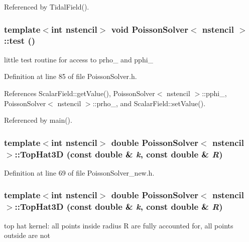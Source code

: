 Referenced by TidalField().

\subsubsection[{test}]{\setlength{\rightskip}{0pt plus 5cm}template$<$int nstencil$>$ void {\bf PoissonSolver}$<$ nstencil $>$::test ()}\label{classPoissonSolver_a403a4e00c0fbb7bcce4c1a55eb5414c9}
little test routine for access to prho\_\- and pphi\_\- 

Definition at line 85 of file PoissonSolver.h.



References ScalarField::getValue(), PoissonSolver$<$ nstencil $>$::pphi\_\-, PoissonSolver$<$ nstencil $>$::prho\_\-, and ScalarField::setValue().



Referenced by main().

\subsubsection[{TopHat3D}]{\setlength{\rightskip}{0pt plus 5cm}template$<$int nstencil$>$ double {\bf PoissonSolver}$<$ nstencil $>$::TopHat3D (const double \& {\em k}, \/  const double \& {\em R})}\label{classPoissonSolver_a291b425d9549b3cede155db6780e0566}


Definition at line 69 of file PoissonSolver\_\-new.h.

\subsubsection[{TopHat3D}]{\setlength{\rightskip}{0pt plus 5cm}template$<$int nstencil$>$ double {\bf PoissonSolver}$<$ nstencil $>$::TopHat3D (const double \& {\em k}, \/  const double \& {\em R})}\label{classPoissonSolver_a291b425d9549b3cede155db6780e0566}
top hat kernel: all points inside radius R are fully accounted for, all points outside are not 

